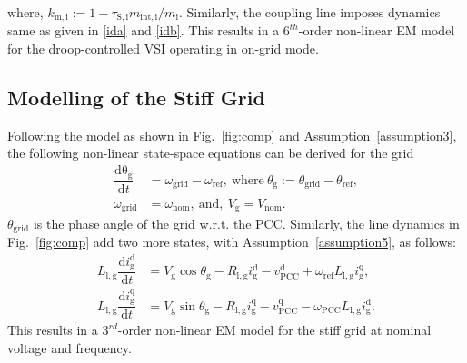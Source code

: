 \documentclass[journal]{IEEEtran}
\begin{document}
where, $k_\mathrm{m,i}:=1- \tau_\mathrm{S,i}m_\mathrm{int,i}/m_\mathrm{i}$. Similarly, the coupling line imposes dynamics same as given in \eqref{ida} and \eqref{idb}.
This results in a $6^{th}$-order non-linear EM model for the droop-controlled VSI operating in on-grid mode.
\subsection{Modelling of the Stiff Grid}
Following the model as shown in Fig.~\ref{fig:comp} and Assumption~\ref{assumption3}, the following non-linear state-space equations can be derived for the grid
\begin{align}\label{thetagrid}
    \dfrac{\mathrm{d\theta_\mathrm{g}}}{\mathrm{d}t} &= \omega_\mathrm{grid}-\omega_\mathrm{ref},~\text{where}~\theta_\mathrm{g}:=\theta_\mathrm{grid}-\theta_\mathrm{ref},\\
    \omega_\mathrm{grid}&=\omega_\mathrm{nom},~\text{and},~V_\mathrm{g}=V_\mathrm{nom}.\nonumber
\end{align}
$\theta_\mathrm{grid}$ is the phase angle of the grid w.r.t. the PCC. Similarly, the line dynamics in Fig.~\ref{fig:comp} add two more states, with Assumption~\ref{assumption5}, as follows:
\begin{align}
    L_\mathrm{l,g}\dfrac{\mathrm{d}i_\mathrm{g}^\mathrm{d}}{\mathrm{d}t}&=V_\mathrm{g}\cos\theta_\mathrm{g}-R_\mathrm{l,g}i_\mathrm{g}^\mathrm{d}-v_\mathrm{PCC}^\mathrm{d}+\omega_{\mathrm{ref}}L_\mathrm{l,g}i_\mathrm{g}^\mathrm{q},\label{idg}\\
    L_\mathrm{l,g}\dfrac{\mathrm{d}i_\mathrm{g}^\mathrm{q}}{\mathrm{d}t}&=V_\mathrm{g}\sin\theta_\mathrm{g}-R_\mathrm{l,g}i_\mathrm{g}^\mathrm{q}-v_\mathrm{PCC}^\mathrm{q}-\omega_{\mathrm{PCC}}L_\mathrm{l,g}i_\mathrm{g}^\mathrm{d}.\label{iqg}
\end{align}
This results in a $3^{rd}$-order non-linear EM model for the stiff grid at nominal voltage and frequency.
\end{document}
